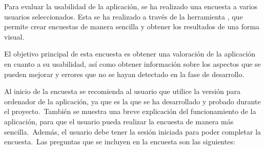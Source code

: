 
Para evaluar la usabilidad de la aplicación, se ha realizado una encuesta a varios usuarios seleccionados.
Esta se ha realizado a través de la herramienta , que permite crear encuestas de manera
sencilla y obtener los resultados de una forma visual.

El objetivo principal de esta encuesta es obtener una
valoración de la aplicación en cuanto a su usabilidad, así como obtener información sobre los aspectos que se pueden
mejorar y errores que no se hayan detectado en la fase de desarrollo.

Al inicio de la encuesta se recomienda al usuario que utilice la versión para ordenador de la aplicación, ya que
es la que se ha desarrollado y probado durante el proyecto.\ También se muestra una breve explicación del funcionamiento
de la aplicación, para que el usuario pueda realizar la encuesta de manera más sencilla.\ Además, el usuario debe
tener la sesión iniciada para poder completar la encuesta.\ Las preguntas que se incluyen en la encuesta son las
siguientes:

